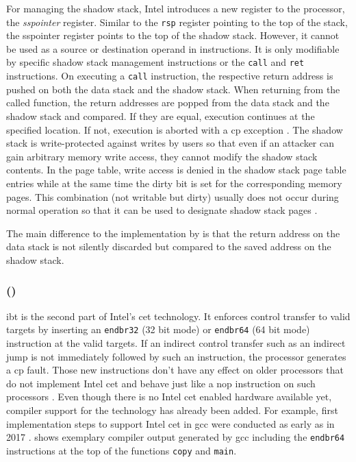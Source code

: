 For managing the shadow stack, Intel introduces a new register to the processor, the \emph{\gls{sspointer}} register.
Similar to the \texttt{rsp} register pointing to the top of the stack, the \gls{sspointer} register points to the top of the shadow stack.
However, it cannot be used as a source or destination operand in instructions.
It is only modifiable by specific shadow stack management instructions or the \texttt{call} and \texttt{ret} instructions.
On executing a \texttt{call} instruction, the respective return address is pushed on both the data stack and the shadow stack.
When returning from the called function, the return addresses are popped from the data stack and the shadow stack and compared.
If they are equal, execution continues at the specified location.
If not, execution is aborted with a \gls{cp} exception \cite[12\psqq]{IntelCorporation2019}.
The shadow stack is write-protected against writes by users so that even if an attacker can gain arbitrary memory write access, they cannot modify the shadow stack contents.
In the page table, write access is denied in the shadow stack page table entries while at the same time the dirty bit is set for the corresponding memory pages.
This combination (not writable but dirty) usually does not occur during normal operation so that it can be used to designate shadow stack pages \cite[141\psqq]{IntelCorporation2019}.

The main difference to the implementation by \citeauthor{Abadi2005} is that the return address on the data stack is not silently discarded but compared to the saved address on the shadow stack.

\subsubsection{ ()}
\label{subsubsec:intel-cet-ibt}

\Acrfull{ibt} is the second part of Intel's \gls{cet} technology.
It enforces control transfer to valid targets by inserting an \texttt{endbr32} (32 bit mode) or \texttt{endbr64} (64 bit mode) instruction at the valid targets.
If an indirect control transfer such as an indirect jump is not immediately followed by such an instruction, the processor generates a \gls{cp} fault.
Those new instructions don't have any effect on older processors that do not implement Intel \gls{cet} and behave just like a \gls{nop} instruction on such processors \cite[18]{IntelCorporation2019}.
Even though there is no Intel \gls{cet} enabled hardware available yet, compiler support for the technology has already been added.
For example, first implementation steps to support Intel \gls{cet} in \gls{gcc} were conducted as early as in 2017 \cite{GCC2020}.
 shows exemplary compiler output generated by \gls{gcc} including the \texttt{endbr64} instructions at the top of the functions \texttt{copy} and \texttt{main}.


